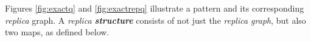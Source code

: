 
Figures \ref{fig:exactq} and \ref{fig:exactrepq} illustrate a pattern and its
corresponding \emph{replica} graph. A \emph{replica \textbf{structure}} consists of not
just the \emph{replica graph}, but also two maps, as
defined below.

